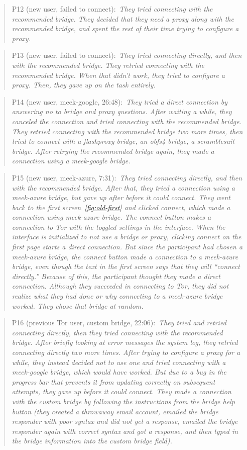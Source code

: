 \documentclass[USenglish,oneside,twocolumn]{article}
\newcommand{\pquote}[2]{
\begin{quotation}
\noindent #1:~\textit{#2}
\end{quotation}
}
\begin{document}
\pquote{P12 (new user, failed to connect)}{They tried connecting with the recommended bridge. They decided that they need a proxy along with the recommended bridge, and spent the rest of their time trying to configure a proxy.}

\pquote{P13 (new user, failed to connect)}{They tried connecting directly, and then with the recommended bridge. They retried connecting with the recommended bridge. When that didn't work, they tried to configure a proxy. Then, they gave up on the task entirely.}

\pquote{P14 (new user, meek-google, 26:48)}{They tried a direct connection by answering no to bridge and proxy questions. After waiting a while, they canceled the connection and tried connecting with the recommended bridge. They retried connecting with the recommended bridge two more times, then tried to connect with a flashproxy bridge, an obfs4 bridge, a scramblesuit bridge. After retrying the recommended bridge again, they made a connection using a meek-google bridge.}

\pquote{P15 (new user, meek-azure, 7:31)}{They tried connecting directly, and then with the recommended bridge. After that, they tried a connection using a meek-azure bridge, but gave up after before it could connect. They went back to the first screen~\ref{fig:old-first} and clicked connect, which made a connection using meek-azure bridge. The connect button makes a connection to Tor with the toggled settings in the interface. When the interface is initialized to not use a bridge or proxy, clicking connect on the first page starts a direct connection. But since the participant had chosen a meek-azure bridge, the connect button made a connection to a meek-azure bridge, even though the text in the first screen says that they will ``connect directly.'' Because of this, the participant thought they made a direct connection. Although they succeeded in connecting to Tor, they did not realize what they had done or why connecting to a meek-azure bridge worked. They chose that bridge at random.}

\pquote{P16 (previous Tor user, custom bridge, 22:06)}{They tried and retried connecting directly, then they tried connecting with the recommended bridge. After briefly looking at error messages the system log, they retried connecting directly two more times. After trying to configure a proxy for a while, they instead decided not to use one and tried connecting with a meek-google bridge, which would have worked. But  due to a bug in the progress bar that prevents it from updating correctly on subsequent attempts, they gave up before it could connect. They made a connection with the custom bridge by following the instructions from the bridge help button (they created a throwaway email account, emailed the bridge responder with poor syntax and did not get a response, emailed the bridge responder again with correct syntax and got a response, and then typed in the bridge information into the custom bridge field).}
\end{document}
